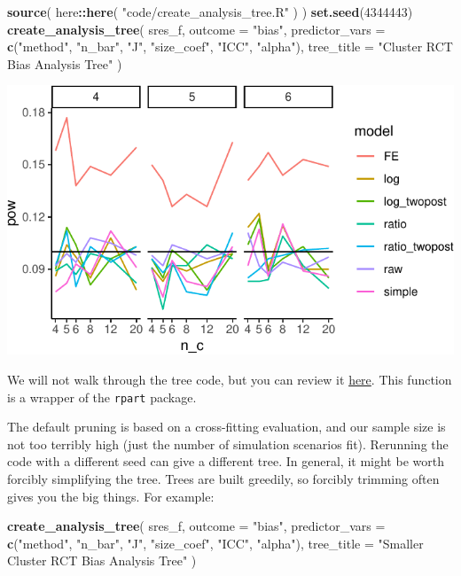 \documentclass[
]{book}
\newenvironment{Shaded}{\begin{snugshade}}{\end{snugshade}}
\newcommand{\AttributeTok}[1]{\textcolor[rgb]{0.13,0.29,0.53}{#1}}
\newcommand{\DecValTok}[1]{\textcolor[rgb]{0.00,0.00,0.81}{#1}}
\newcommand{\FunctionTok}[1]{\textcolor[rgb]{0.13,0.29,0.53}{\textbf{#1}}}
\newcommand{\NormalTok}[1]{#1}
\newcommand{\SpecialCharTok}[1]{\textcolor[rgb]{0.81,0.36,0.00}{\textbf{#1}}}
\newcommand{\StringTok}[1]{\textcolor[rgb]{0.31,0.60,0.02}{#1}}
\begin{document}
\begin{Shaded}
\begin{Highlighting}[]
\FunctionTok{source}\NormalTok{( here}\SpecialCharTok{::}\FunctionTok{here}\NormalTok{( }\StringTok{"code/create\_analysis\_tree.R"}\NormalTok{ ) )}
\FunctionTok{set.seed}\NormalTok{(}\DecValTok{4344443}\NormalTok{)}
\FunctionTok{create\_analysis\_tree}\NormalTok{( sres\_f,}
                      \AttributeTok{outcome =} \StringTok{"bias"}\NormalTok{,}
                      \AttributeTok{predictor\_vars =} \FunctionTok{c}\NormalTok{(}\StringTok{"method"}\NormalTok{, }\StringTok{"n\_bar"}\NormalTok{, }\StringTok{"J"}\NormalTok{,}
                                         \StringTok{"size\_coef"}\NormalTok{, }\StringTok{"ICC"}\NormalTok{, }\StringTok{"alpha"}\NormalTok{),}
                      \AttributeTok{tree\_title =} \StringTok{"Cluster RCT Bias Analysis Tree"}\NormalTok{ )}
\end{Highlighting}
\end{Shaded}

\begin{center}\includegraphics[width=0.75\linewidth]{Designing-Simulations-in-R_files/figure-latex/unnamed-chunk-258-1} \end{center}

We will not walk through the tree code, but you can review it \href{code/create_analysis_tree.R}{here}.
This function is a wrapper of the \texttt{rpart} package.

The default pruning is based on a cross-fitting evaluation, and our sample size is not too terribly high (just the number of simulation scenarios fit).
Rerunning the code with a different seed can give a different tree.
In general, it might be worth forcibly simplifying the tree.
Trees are built greedily, so forcibly trimming often gives you the big things.
For example:

\begin{Shaded}
\begin{Highlighting}[]
\FunctionTok{create\_analysis\_tree}\NormalTok{( sres\_f,}
                      \AttributeTok{outcome =} \StringTok{"bias"}\NormalTok{,}
                      \AttributeTok{predictor\_vars =} \FunctionTok{c}\NormalTok{(}\StringTok{"method"}\NormalTok{, }\StringTok{"n\_bar"}\NormalTok{, }\StringTok{"J"}\NormalTok{,}
                                         \StringTok{"size\_coef"}\NormalTok{, }\StringTok{"ICC"}\NormalTok{, }\StringTok{"alpha"}\NormalTok{),}
                      \AttributeTok{tree\_title =} \StringTok{"Smaller Cluster RCT Bias Analysis Tree"}\NormalTok{ )}
\end{Highlighting}
\end{Shaded}
\end{document}
